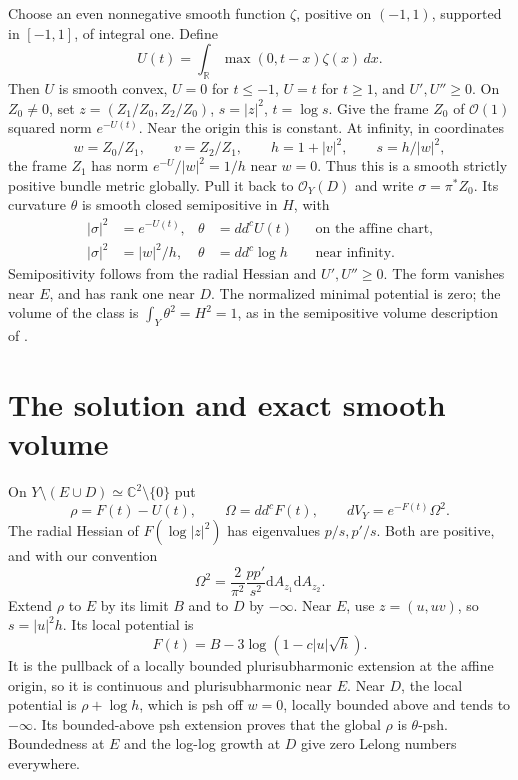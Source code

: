 \documentclass[11pt]{article}
\newcommand{\ddc}{dd^c}
\newcommand{\dA}{\mathrm dA}
\newcommand{\C}{\mathbb C}
\begin{document}
Choose an even nonnegative smooth function $\zeta$, positive on $(-1,1)$,
supported in $[-1,1]$, of integral one. Define
\[
 U(t)=\int_{\mathbb R}\max(0,t-x)\zeta(x)\,dx.
\]
Then $U$ is smooth convex, $U=0$ for $t\leq-1$, $U=t$ for
$t\geq1$, and $U',U''\geq0$. On $Z_0\ne0$, set
$z=(Z_1/Z_0,Z_2/Z_0)$, $s=|z|^2$, $t=\log s$.
Give the frame $Z_0$ of $\mathcal O(1)$ squared norm $e^{-U(t)}$.
Near the origin this is constant. At infinity, in coordinates
\[
 w=Z_0/Z_1,\qquad v=Z_2/Z_1,\qquad h=1+|v|^2,
 \qquad s=h/|w|^2,
\]
the frame $Z_1$ has norm $e^{-U}/|w|^2=1/h$ near $w=0$.
Thus this is a smooth strictly positive bundle metric globally.
Pull it back to $\mathcal O_Y(D)$ and write $\sigma=\pi^*Z_0$.
Its curvature $\theta$ is smooth closed semipositive in $H$, with
\begin{align}
 |\sigma|^2&=e^{-U(t)},&\theta&=\ddc U(t)&&\text{on the affine chart},\label{eq:background}\\
 |\sigma|^2&=|w|^2/h,&\theta&=\ddc\log h&&\text{near infinity}.
\end{align}
Semipositivity follows from the radial Hessian and $U',U''\geq0$.
The form vanishes near $E$, and has rank one near $D$.
The normalized minimal potential is zero; the volume of the class is
$\int_Y\theta^2=H^2=1$, as in the semipositive volume description
of \cite[Sections 1.5 and 4]{BEGZ}.

\section{The solution and exact smooth volume}
On $Y\setminus(E\cup D)\simeq\C^2\setminus\{0\}$ put
\begin{equation}\label{eq:solution}
 \rho=F(t)-U(t),\qquad \Omega=\ddc F(t),\qquad
 dV_Y=e^{-F(t)}\Omega^2.
\end{equation}
The radial Hessian of $F(\log|z|^2)$ has eigenvalues $p/s,p'/s$.
Both are positive, and with our convention
\begin{equation}\label{eq:determinant}
 \Omega^2=\frac2{\pi^2}\frac{pp'}{s^2}\dA_{z_1}\dA_{z_2}.
\end{equation}
Extend $\rho$ to $E$ by its limit $B$ and to $D$ by $-\infty$.
Near $E$, use $z=(u,uv)$, so $s=|u|^2h$. Its local potential is
\[
 F(t)=B-3\log(1-c|u|\sqrt h).
\]
It is the pullback of a locally bounded plurisubharmonic extension at
the affine origin, so it is continuous and plurisubharmonic near $E$.
Near $D$, the local potential is $\rho+\log h$, which is psh off
$w=0$, locally bounded above and tends to $-\infty$.
Its bounded-above psh extension \cite[Proposition 3.3.25]{JP} proves that the global $\rho$ is
$\theta$-psh. Boundedness at $E$ and the log-log growth at $D$ give
zero Lelong numbers everywhere.
\end{document}
